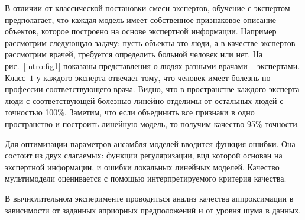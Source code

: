 \documentclass[12pt, twoside]{article}
\numberwithin{equation}{section}
\begin{document}
В отличии от классической постановки смеси экспертов, обучение с экспертом предполагает, что каждая модель имеет собственное признаковое описание объектов, которое построено на основе экспертной информации. Например рассмотрим следующую задачу: пусть объекты это люди, а в качестве экспертов рассмотрим врачей, требуется определить больной человек или нет. На рис.~\ref{intro:fig1} показаны представления о людях разными врачами -- экспертами. Класс~$1$ у каждого эксперта отвечает тому, что человек имеет болезнь по профессии соответствующего врача. Видно, что в пространстве каждого эксперта люди с соответствующей болезнью линейно отделимы от остальных людей с точностью 100\%. Заметим, что если объединить все признаки в одно пространство и построить линейную модель, то получим качество 95\% точности. 

Для оптимизации параметров ансамбля моделей вводится функция ошибки. Она состоит из двух слагаемых: функции регуляризации, вид которой основан на экспертной информации, и ошибки локальных линейных моделей. Качество мультимодели оценивается с помощью интерпретируемого критерия качества.

В вычислительном эксперименте проводиться анализ качества аппроксимации в зависимости от заданных априорных предположений и от уровня шума в данных.
\end{document}
